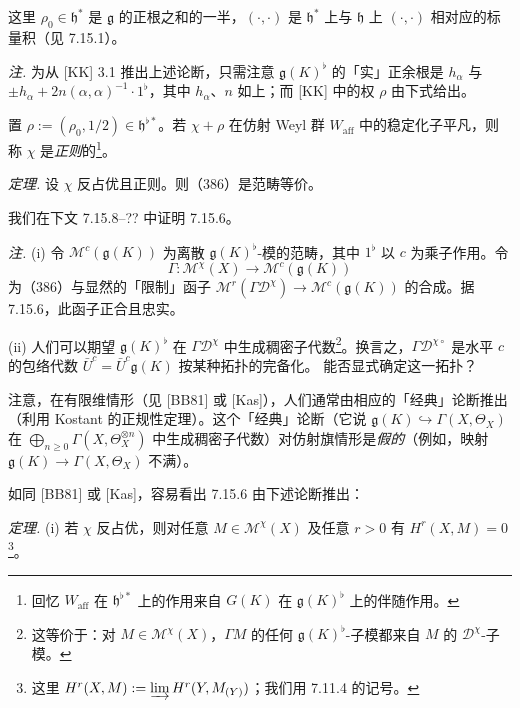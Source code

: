 这里 $\rho_0\in\mathfrak{h}^{*}$ 是 $\mathfrak{g}$ 的正根之和的一半，$(\cdot,\cdot)$ 是 $\mathfrak{h}^{*}$ 上与 $\mathfrak{h}$ 上 $(\cdot,\cdot)$ 相对应的标量积（见 7.15.1）。

\emph{注.} 为从 [KK] 3.1 推出上述论断，只需注意 $\mathfrak{g}(K)^{\flat}$ 的「实」正余根是 $h_{\alpha}$ 与 $\pm h_{\alpha}+2n(\alpha,\alpha)^{-1}\cdot1^{\flat}$，其中 $h_{\alpha}$、$n$ 如上；而 [KK] 中的权 $\rho$ 由下式给出。

置 $\rho:=(\rho_0,1/2)\in\mathfrak{h}^{\flat*}$。若 $\chi+\rho$ 在仿射 Weyl 群 $W_{\mathrm{aff}}$ 中的稳定化子平凡，则称 $\chi$ 是\emph{正则}的\footnote{回忆 $W_{\mathrm{aff}}$ 在 $\mathfrak{h}^{\flat*}$ 上的作用来自 $G(K)$ 在 $\mathfrak{g}(K)^{\flat}$ 上的伴随作用。}。

 \emph{定理.} 设 $\chi$ 反占优且正则。则（386）是范畴等价。

我们在下文 7.15.8--?? 中证明 7.15.6。

 \emph{注.} (i) 令 $\mathcal{M}^{c}(\mathfrak{g}(K))$ 为离散 $\mathfrak{g}(K)^{\flat}$-模的范畴，其中 $1^{\flat}$ 以 $c$ 为乘子作用。令
\begin{equation}\tag{387}
\Gamma:\mathcal{M}^{\chi}(X)\to\mathcal{M}^{c}(\mathfrak{g}(K))
\end{equation}
为（386）与显然的「限制」函子 $\mathcal{M}^{r}(\Gamma\mathcal{D}^{\chi})\to\mathcal{M}^{c}(\mathfrak{g}(K))$ 的合成。据 7.15.6，此函子正合且忠实。

(ii) 人们可以期望 $\mathfrak{g}(K)^{\flat}$ 在 $\Gamma\mathcal{D}^{\chi}$ 中生成稠密子代数\footnote{这等价于：对 $M\in\mathcal{M}^{\chi}(X)$，$\Gamma M$ 的任何 $\mathfrak{g}(K)^{\flat}$-子模都来自 $M$ 的 $\mathcal{D}^{\chi}$-子模。}。换言之，$\Gamma\mathcal{D}^{\chi\circ}$ 是水平 $c$ 的包络代数 $\bar U^{c}=\bar U^{c}\mathfrak{g}(K)$ 按某种拓扑的完备化。%
能否显式确定这一拓扑？

注意，在有限维情形（见 [BB81] 或 [Kas]），人们通常由相应的「经典」论断推出%
（利用 Kostant 的正规性定理）。这个「经典」论断（它说 $\mathfrak{g}(K)\hookrightarrow\Gamma(X,\Theta_X)$ 在 $\bigoplus_{n\ge0}\Gamma(X,\Theta_X^{\otimes n})$ 中生成稠密子代数）对仿射旗情形是\emph{假的}（例如，映射 $\mathfrak{g}(K)\to\Gamma(X,\Theta_X)$ 不满）。

如同 [BB81] 或 [Kas]，容易看出 7.15.6 由下述论断推出：

 \emph{定理.} (i) 若 $\chi$ 反占优，则对任意 $M\in\mathcal{M}^{\chi}(X)$ 及任意 $r>0$ 有 $H^{r}(X,M)=0$\footnote{这里 $H^{r}(X,M):=\varinjlim H^{r}(Y,M_{(Y)})$；我们用 7.11.4 的记号。}。

